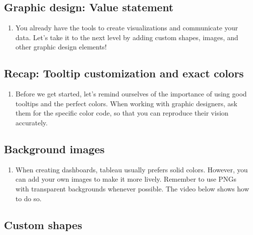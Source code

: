 \documentclass[
]{book}
\providecommand{\tightlist}{%
  \setlength{\itemsep}{0pt}\setlength{\parskip}{0pt}}
\begin{document}
\hypertarget{graphic-design-value-statement}{%
\subsection{Graphic design: Value statement}\label{graphic-design-value-statement}}

\begin{enumerate}
\def\labelenumi{\arabic{enumi}.}
\tightlist
\item
  You already have the tools to create visualizations and communicate your data. Let's take it to the next level by adding custom shapes, images, and other graphic design elements!
\end{enumerate}

\hypertarget{recap-tooltip-customization-and-exact-colors}{%
\subsection{Recap: Tooltip customization and exact colors}\label{recap-tooltip-customization-and-exact-colors}}

\begin{enumerate}
\def\labelenumi{\arabic{enumi}.}
\tightlist
\item
  Before we get started, let's remind ourselves of the importance of using good tooltips and the perfect colors. When working with graphic designers, ask them for the specific color code, so that you can reproduce their vision accurately.
\end{enumerate}

\hypertarget{background-images}{%
\subsection{Background images}\label{background-images}}

\begin{enumerate}
\def\labelenumi{\arabic{enumi}.}
\tightlist
\item
  When creating dashboards, tableau usually prefers solid colors. However, you can add your own images to make it more lively. Remember to use PNGs with transparent backgrounds whenever possible. The video below shows how to do so.
\end{enumerate}

\hypertarget{custom-shapes}{%
\subsection{Custom shapes}\label{custom-shapes}}
\end{document}
